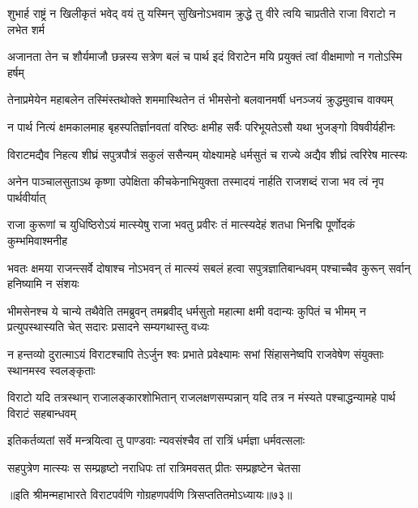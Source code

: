 \fourlineindentedshloka
{शुभार्ह राष्ट्रं न खिलीकृतं भवेद्}
{वयं तु यस्मिन् सुखिनोऽभवाम}
{क्रुद्धे तु वीरे त्वयि चाप्रतीते}
{राजा विराटो न लभेत शर्म}


\fourlineindentedshloka
{अजानता तेन च शौर्यमाजौ}
{छन्नस्य सत्रेण बलं च पार्थ}
{इदं विराटेन मयि प्रयुक्तं}
{त्वां वीक्षमाणो न गतोऽस्मि हर्षम्}


\fourlineindentedshloka
{तेनाप्रमेयेन महाबलेन}
{तस्मिंस्तथोक्ते शममास्थितेन}
{तं भीमसेनो बलवानमर्षी}
{धनञ्जयं क्रुद्धमुवाच वाक्यम्}


\fourlineindentedshloka
{न पार्थ नित्यं क्षमकालमाह}
{बृहस्पतिर्ज्ञानवतां वरिष्ठः}
{क्षमीह सर्वैः परिभूयतेऽसौ}
{यथा भुजङ्गो विषवीर्यहीनः}


\fourlineindentedshloka
{विराटमद्यैव निहत्य शीघ्रं}
{सपुत्रपौत्रं सकुलं ससैन्यम्}
{योक्ष्यामहे धर्मसुतं च राज्ये}
{अद्यैव शीघ्रं त्वरिरेष मात्स्यः}


\fourlineindentedshloka
{अनेन पाञ्चालसुताऽथ कृष्णा}
{उपेक्षिता कीचकेनाभियुक्ता}
{तस्मादयं नार्हति राजशब्दं}
{राजा भव त्वं नृप पार्थवीर्यात्}


\fourlineindentedshloka
{राजा कुरूणां च युधिष्ठिरोऽयं}
{मात्स्येषु राजा भवतु प्रवीरः}
{तं मात्स्यदेहं शतधा भिनद्मि}
{पूर्णोदकं कुम्भमिवाश्मनीह}




\threelineshloka
{भवतः क्षमया राजन्त्सर्वे दोषाश्च नोऽभवन्}
{तं मात्स्यं सबलं हत्वा सपुत्रज्ञातिबान्धवम्}
{पश्चाच्चैव कुरून् सर्वान् हनिष्यामि न संशयः}


\onelineshloka
{भीमसेनश्च ये चान्ये तथैवेति तमब्रुवन्}
\fourlineindentedshloka
{तमब्रवीद् धर्मसुतो महात्मा}
{क्षमी वदान्यः कुपितं च भीमम्}
{न प्रत्युपस्थास्यति चेत् सदारः}
{प्रसादने सम्यगथास्तु वध्यः}


\onelineshloka
{न हन्तव्यो दुरात्माऽयं विराटश्चापि तेऽर्जुन}
\twolineshloka
{श्वः प्रभाते प्रवेक्ष्यामः सभां सिंहासनेष्वपि}
{राजवेषेण संयुक्ताः स्थानमस्व स्वलङ्कृताः}


\threelineshloka
{विराटो यदि तत्रस्थान् राजालङ्कारशोभितान्}
{राजलक्षणसम्पन्नान् यदि तत्र न मंस्यते}
{पश्चाद्धन्यामहे पार्थ विराटं सहबान्धवम्}


\twolineshloka
{इतिकर्तव्यतां सर्वे मन्त्रयित्वा तु पाण्डवाः}
{न्यवसंश्चैव तां रात्रिं धर्मज्ञा धर्मवत्सलाः}


\twolineshloka
{सहपुत्रेण मात्स्यः स सम्प्रहृष्टो नराधिपः}
{तां रात्रिमवसत् प्रीतः सम्प्रहृष्टेन चेतसा}

॥इति श्रीमन्महाभारते विराटपर्वणि गोग्रहणपर्वणि त्रिसप्ततितमोऽध्यायः॥७३॥ 

